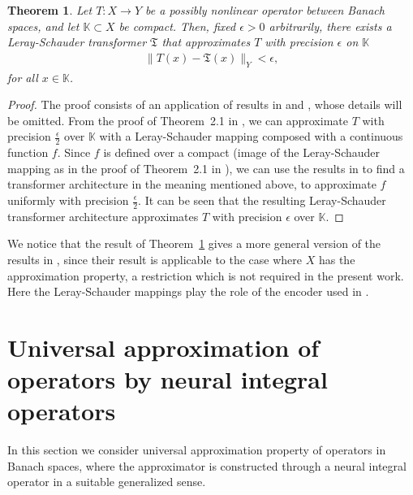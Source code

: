 \documentclass[a4paper,12pt,reqno]{amsart}
\newtheorem{thm}{Theorem}[section]
\theoremstyle{definition}
\theoremstyle{remark}
\begin{document}
\begin{thm}\label{thm:LR_transf}
    Let $T: X \longrightarrow Y$ be a possibly nonlinear operator between Banach spaces, and let $\mathbb K \subset X$ be compact. Then, fixed $\epsilon >0$ arbitrarily, there exists a Leray-Schauder transformer $\mathfrak T$ that approximates $T$ with precision $\epsilon$ on $\mathbb K$
    \begin{eqnarray*}
        \|T(x) - \mathfrak T(x)\|_Y < \epsilon,
    \end{eqnarray*}
    for all $x\in \mathbb K$. 
\end{thm}
\begin{proof}
    The proof consists of an application of results in \cite{EZ} and \cite{fang2022attention}, whose details will be omitted. From the proof of Theorem~2.1 in \cite{EZ}, we can approximate $T$ with precision $\frac{\epsilon}{2}$ over $\mathbb K$ with a Leray-Schauder mapping composed with a continuous function $f$. Since $f$ is defined over a compact (image of the Leray-Schauder mapping as in the proof of Theorem~2.1 in \cite{EZ}), we can use the results in \cite{fang2022attention,cordonnier2019relationship} to find a transformer architecture in the meaning mentioned above, to approximate $f$ uniformly with precision $\frac{\epsilon}{2}$. It can be seen that the resulting Leray-Schauder transformer architecture approximates $T$ with precision $\epsilon$ over $\mathbb K$.
\end{proof}

We notice that the result of Theorem~\ref{thm:LR_transf} gives a more general version of the results in \cite{shih2025transformers}, since their result is applicable to the case where $X$ has the approximation property, a restriction which is not required in the present work. Here the Leray-Schauder mappings play the role of the encoder used in \cite{shih2025transformers}. 


\section{Universal approximation of operators by neural integral operators}\label{sec:NIE}

In this section we consider universal approximation property of operators in Banach spaces, where the approximator is constructed through a neural integral operator in a suitable generalized sense.
\end{document}
